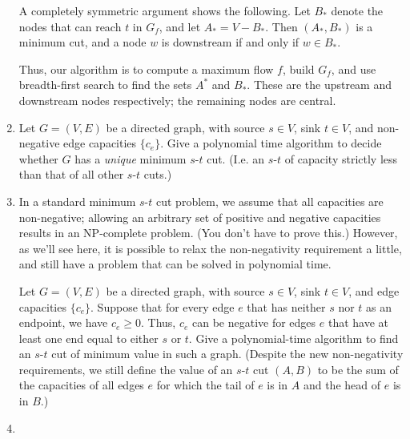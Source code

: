 \documentclass[12pt]{article}
\begin{document}
\begin{enumerate}
{A completely symmetric argument shows the following.
Let $B_*$ denote the nodes that can reach $t$ in $G_f$,
and let $A_* = V - B_*$.
Then $(A_*, B_*)$ is a minimum cut, and a node 
$w$ is downstream if and only if $w \in B_*$.

Thus, our algorithm is to compute a maximum flow $f$, 
build $G_f$, and use breadth-first search to find the
sets $A^*$ and $B_*$.
These are the upstream and downstream nodes respectively;
the remaining nodes are central.

}



\item 

Let $G = (V,E)$ be a directed graph, with
source $s \in V$, sink $t \in V$,
and non-negative edge capacities $\{c_e\}$.
Give a polynomial time algorithm to decide whether
$G$ has a {\em unique} minimum $s$-$t$ cut.
(I.e. an $s$-$t$ of capacity strictly less
than that of all other $s$-$t$ cuts.)



\item 

In a standard minimum $s$-$t$ cut problem, we assume
that all capacities are non-negative;
allowing an arbitrary set of positive and negative
capacities results in an NP-complete problem.
(You don't have to prove this.)
However, as we'll see here,
it is possible to relax the non-negativity
requirement a little, and still have a problem
that can be solved in polynomial time.

Let $G = (V,E)$ be a directed graph, with
source $s \in V$, sink $t \in V$,
and edge capacities $\{c_e\}$.
Suppose that for every edge $e$ that has neither
$s$ nor $t$ as an endpoint, we have $c_e \geq 0$.
Thus, $c_e$ can be negative for edges $e$ that have
at least one end equal to either $s$ or $t$.
Give a polynomial-time algorithm to find an
$s$-$t$ cut of minimum value in such a graph.
(Despite the new non-negativity requirements,
we still define the value of an $s$-$t$ cut $(A,B)$
to be the sum of the capacities of all edges $e$
for which the tail of $e$ is in $A$ and the head
of $e$ is in $B$.)






\item 


\end{enumerate}
\end{document}
